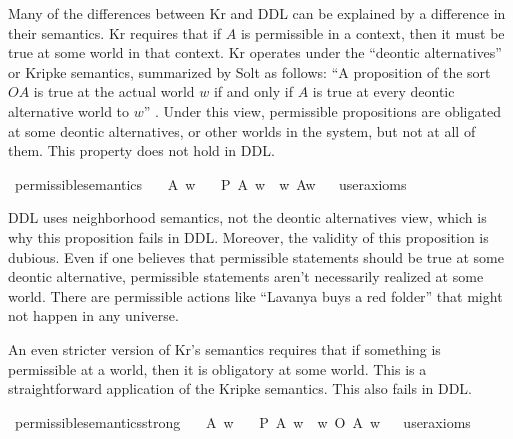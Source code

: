 \begin{isabellebody}
\begin{isamarkuptext}
Many of the differences between Kr and DDL can be explained by a difference in their semantics. Kr 
requires that if $A$ is permissible in a context, then 
it must be true at some world in that context. Kr operates under the ``deontic alternatives'' or Kripke semantics, 
summarized by Solt as follows: ``A proposition of the sort $O A$ is true at the actual world $w$ if and
only if $A$ is true at every deontic alternative world to $w$''  \citep{solt}. Under this view, permissible propositions
are obligated at some deontic alternatives, or other worlds in the system, but not at all of them. This
property does not hold in DDL.%
\end{isamarkuptext}\isamarkuptrue%
\isamarkupfalse%
\ permissible{\isacharunderscore}semantics{\isacharcolon}\isanewline
\ \ \ A\ w\isanewline
\ \ \ {\isachardoublequoteopen}{\isacharparenleft}P\ {\isacharbraceleft}A{\isacharbraceright}{\isacharparenright}\ w\ {\isasymlongrightarrow}\ {\isacharparenleft}{\isasymexists}w{\isacharprime}{\isachardot}\ A{\isacharparenleft}w{\isacharprime}{\isacharparenright}{\isacharparenright}{\isachardoublequoteclose}\isanewline
\ \ \isamarkupfalse%
{\isacharbrackleft}user{\isacharunderscore}axioms{\isacharbrackright}%
\isadelimproof
\ %
\endisadelimproof
%
\isatagproof
{}\isamarkupfalse%
\isanewline
%
%
\endisatagproof
{\isafoldproof}%
%
\isadelimproof
%
\endisadelimproof
%
\begin{isamarkuptext}%
DDL uses neighborhood semantics, not the deontic alternatives view, which is why this
 proposition fails in DDL. Moreover, the validity of this proposition is dubious. Even if one believes that permissible 
statements should be true at some deontic alternative, permissible statements aren't necessarily
realized at some world. There are permissible actions like ``Lavanya buys a red folder'' that might not 
happen in any universe.

An even stricter version of Kr's semantics requires that if something is permissible at a world, 
then it is obligatory at some world. This is a straightforward application of the Kripke semantics. This
also fails in DDL.%
\end{isamarkuptext}\isamarkuptrue%
\isamarkupfalse%
\ permissible{\isacharunderscore}semantics{\isacharunderscore}strong{\isacharcolon}\isanewline
\ \ \ A\ w\isanewline
\ \ \ {\isachardoublequoteopen}P\ {\isacharbraceleft}A{\isacharbraceright}\ w\ {\isasymlongrightarrow}\ {\isacharparenleft}{\isasymexists}w{\isacharprime}{\isachardot}\ O\ {\isacharbraceleft}A{\isacharbraceright}\ w{\isacharprime}{\isacharparenright}{\isachardoublequoteclose}\isanewline
\ \ \isamarkupfalse%
{\isacharbrackleft}user{\isacharunderscore}axioms{\isacharbrackright}%
\isadelimproof
\ %
\endisadelimproof
%
\isatagproof
{}\isamarkupfalse%
\isanewline
%
\end{isabellebody}
